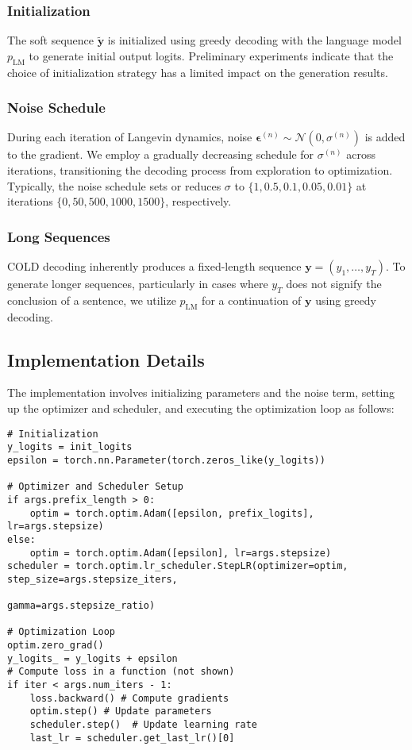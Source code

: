 \documentclass{article}
\begin{document}
\subsubsection*{Initialization}
The soft sequence \(\mathbf{\tilde{y}}\) is initialized using greedy decoding with the language model \(p_{\text{LM}}\) to generate initial output logits. Preliminary experiments indicate that the choice of initialization strategy has a limited impact on the generation results.

\subsubsection*{Noise Schedule}
During each iteration of Langevin dynamics, noise \(\boldsymbol{\epsilon}^{(n)} \sim \mathcal{N}(0, \sigma^{(n)})\) is added to the gradient. We employ a gradually decreasing schedule for \(\sigma^{(n)}\) across iterations, transitioning the decoding process from exploration to optimization. Typically, the noise schedule sets or reduces \(\sigma\) to \(\{1, 0.5, 0.1, 0.05, 0.01\}\) at iterations \(\{0, 50, 500, 1000, 1500\}\), respectively.

\subsubsection*{Long Sequences}
COLD decoding inherently produces a fixed-length sequence \(\mathbf{y} = (y_1, \ldots, y_T)\). To generate longer sequences, particularly in cases where \(y_T\) does not signify the conclusion of a sentence, we utilize \(p_{\text{LM}}\) for a continuation of \(\mathbf{y}\) using greedy decoding.

\subsection{Implementation Details}

The implementation involves initializing parameters and the noise term, setting up the optimizer and scheduler, and executing the optimization loop as follows:

\begin{verbatim}
# Initialization
y_logits = init_logits
epsilon = torch.nn.Parameter(torch.zeros_like(y_logits))

# Optimizer and Scheduler Setup
if args.prefix_length > 0:
    optim = torch.optim.Adam([epsilon, prefix_logits], lr=args.stepsize)
else:
    optim = torch.optim.Adam([epsilon], lr=args.stepsize)
scheduler = torch.optim.lr_scheduler.StepLR(optimizer=optim, step_size=args.stepsize_iters,
                                             gamma=args.stepsize_ratio)

# Optimization Loop
optim.zero_grad()
y_logits_ = y_logits + epsilon
# Compute loss in a function (not shown)
if iter < args.num_iters - 1:
    loss.backward() # Compute gradients
    optim.step() # Update parameters
    scheduler.step()  # Update learning rate
    last_lr = scheduler.get_last_lr()[0]
\end{verbatim}
\end{document}
